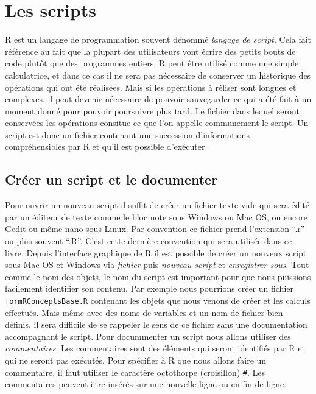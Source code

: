 \documentclass[]{book}
\theoremstyle{definition}
\theoremstyle{definition}
\theoremstyle{definition}
\theoremstyle{remark}
\begin{document}
\section{Les scripts}\label{les-scripts}

R est un langage de programmation souvent dénommé \emph{langage de
script}. Cela fait référence au fait que la plupart des utilisateurs
vont écrire des petits bouts de code plutôt que des programmes entiers.
R peut être utilisé comme une simple calculatrice, et dans ce cas il ne
sera pas nécessaire de conserver un historique des opérations qui ont
été réalisées. Mais si les opérations à réliser sont longues et
complexes, il peut devenir nécessaire de pouvoir sauvegarder ce qui a
été fait à un moment donné pour pouvoir poursuivre plus tard. Le fichier
dans lequel seront conservées les opérations consitue ce que l'on
appelle communement le script. Un script est donc un fichier contenant
une succession d'informations compréhensibles par R et qu'il est
possible d'exécuter.

\subsection{Créer un script et le
documenter}\label{creer-un-script-et-le-documenter}

Pour ouvrir un nouveau script il suffit de créer un fichier texte vide
qui sera édité par un éditeur de texte comme le bloc note sous Windows
ou Mac OS, ou encore Gedit ou même nano sous Linux. Par convention ce
fichier prend l'extension ``.r'' ou plus souvent ``.R''. C'est cette
dernière convention qui sera utilisée dans ce livre. Depuis l'interface
graphique de R il est possible de créer un nouveux script sous Mac OS et
Windows via \emph{fichier} puis \emph{nouveau script} et
\emph{enregistrer sous}. Tout comme le nom des objets, le nom du script
est important pour que nous puissions facilement identifier son contenu.
Par exemple nous pourrions créer un fichier \texttt{formRConceptsBase.R}
contenant les objets que nous venons de créer et les calculs effectués.
Mais même avec des noms de variables et un nom de fichier bien définis,
il sera difficile de se rappeler le sens de ce fichier sans une
documentation accompagnant le script. Pour docummenter un script nous
allons utiliser des \emph{commentaires}. Les commentaires sont des
éléments qui seront identifiés par R et qui ne seront pas exécutés. Pour
spécifier à R que nous allons faire un commentaire, il faut utiliser le
caractère octothorpe (croisillon) \texttt{\#}. Les commentaires peuvent
être insérés sur une nouvelle ligne ou en fin de ligne.
\end{document}
